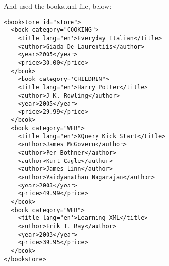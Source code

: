 And used the books.xml file, below: 

\begin{lstlisting}[style=xml, frame=single, caption={books.xml}]
<bookstore id="store">  
  <book category="COOKING">
    <title lang="en">Everyday Italian</title>
    <author>Giada De Laurentiis</author>
    <year>2005</year>
    <price>30.00</price>
  </book>
    <book category="CHILDREN">
    <title lang="en">Harry Potter</title>
    <author>J K. Rowling</author>
    <year>2005</year>
    <price>29.99</price>
  </book>
  <book category="WEB">
    <title lang="en">XQuery Kick Start</title>
    <author>James McGovern</author>
    <author>Per Bothner</author>
    <author>Kurt Cagle</author>
    <author>James Linn</author>
    <author>Vaidyanathan Nagarajan</author>
    <year>2003</year>
    <price>49.99</price>
  </book>
  <book category="WEB">
    <title lang="en">Learning XML</title>
    <author>Erik T. Ray</author>
    <year>2003</year>
    <price>39.95</price>
  </book>
</bookstore> 
\end{lstlisting}


